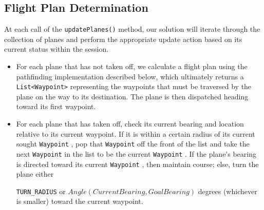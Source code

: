 \documentclass[10pt]{article}
\newcommand{\ms}[1] {
  \texttt{#1}
}
\begin{document}
\subsection{Flight Plan Determination}
At each call of the \ms{updatePlanes()} method, our solution will iterate through the collection of 
planes and perform the appropriate update action based on its current status within the session.
\begin{itemize}
  \item For each plane that has not taken off, we calculate a flight plan using the pathfinding
    implementation described below, which ultimately returns a \ms{List<Waypoint>} representing the waypoints that must
    be traversed by the plane on the way to its destination. The plane is then dispatched heading toward
    its first waypoint.
  \item For each plane that has taken off, check its current bearing and location relative to its
    current waypoint. If it is within a certain radius of its current sought \ms{Waypoint}, pop that \ms{Waypoint} off
    the front of the list and take the next \ms{Waypoint} in the list to be the current \ms{Waypoint}. If the
    plane's bearing is directed toward its current \ms{Waypoint}, then maintain course; else, turn the plane either
    \ms{TURN\_RADIUS} or $Angle(Current Bearing, Goal Bearing)$ degrees (whichever is smaller) toward the current
    waypoint. 
\end{itemize}
    
\end{document}
